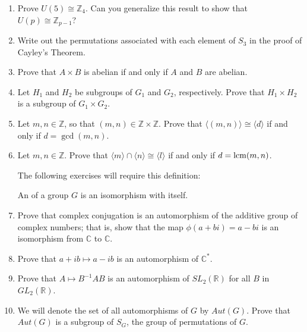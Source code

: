 {\begin{enumerate}[(1)]
 \item
Prove $U(5) \cong {\mathbb Z}_4$. Can you generalize this result to show
that $U(p) \cong {\mathbb Z}_{p-1}$? 
 

\item
Write out the permutations associated with each element of $S_3$ in
the proof of Cayley's Theorem. 


\item
Prove that $A \times B$ is abelian if and only if $A$ and $B$ are
abelian. 
 

 

\item
Let $H_1$ and $H_2$ be subgroups of $G_1$ and $G_2$, respectively. Prove that $H_1 \times H_2$ is a subgroup of $G_1 \times G_2$. 
 

\item
Let $m, n \in {\mathbb Z}$, so that $(m,n) \in \mathbb{Z} \times \mathbb{Z}$. Prove that $\langle (m,n) \rangle \cong \langle d \rangle$ if and only if $d = \gcd(m,n)$.
 

\item
Let $m, n \in {\mathbb Z}$. Prove that $\langle m \rangle \cap \langle n \rangle \cong \langle l \rangle$ if and only if $d = \operatorname{lcm}(m,n)$. 

 \bigskip

\bigskip
 

\noindent
The following exercises  will require this definition:

\begin{defn}
 An  of a group $G$ is an isomorphism
with itself. 
\end{defn}

\item
Prove that complex conjugation is an automorphism of the
additive group of complex numbers; that is, show that the map $\phi(
a + bi ) = a - bi$ is an isomorphism from ${\mathbb C}$ to ${\mathbb C}$. 
 

\item
Prove that $a + ib \mapsto a - ib$ is an automorphism of ${\mathbb C}^*$. 
 

\item
Prove that $A \mapsto B^{-1}AB$ is an automorphism of $SL_2({\mathbb R})$
for all $B$ in $GL_2({\mathbb R})$. 
 
\item
We will denote the set of all automorphisms of $G$ by
$Aut(G)$.  Prove that  $Aut(G)$ is a subgroup of
$S_G$, the group of permutations of $G$. 
 

\end{enumerate}}
